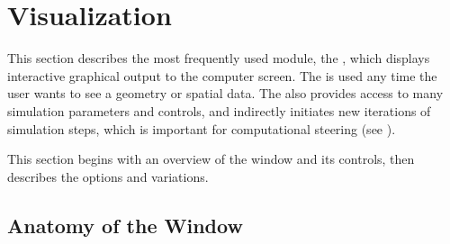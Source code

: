  \newcommand{\boxwidget}%
  {\centerline{\epsfig{file=Figures/widget-box.eps.gz,height=2in,
  bbllx=0, bblly=0, bburx=458, bbury=342}}}
\begin{htmlonly}
  \newcommand{\boxwidget}{%
  \htmladdimg[align=top,width=459,alt="boxwidget"]
  {../Figures/widget-box.gif}}
\end{htmlonly}

  \newcommand{\ringwidget}%
  {\centerline{\epsfig{file=Figures/widget-ring.eps.gz,height=2in,
  bbllx=0, bblly=0, bburx=507, bbury=467}}}
\begin{htmlonly}
  \newcommand{\ringwidget}{%
  \htmladdimg[align=top,width=508,alt="ringwidget"]
  {../Figures/widget-ring.gif}}
\end{htmlonly}

  \newcommand{\recordmoviewin}%
  {\centerline{\epsfig{file=Figures/record_movie_win.eps.gz,
  bbllx=0, bblly=0, bburx=257, bbury=175}}}
\begin{htmlonly}
  \newcommand{\recordmoviewin}{%
  \htmladdimg[align=top,alt="Movie Recording Dialog"]
  {../Figures/record_movie_win.gif}}
\end{htmlonly}

\newcommand{\graphics}{\emph{Graphics}}

\chapter{Visualization}
\label{ch:viewer}

This section describes the most frequently used \sr{} module,
the \viewer{}, which displays interactive graphical
output to the computer screen.  The \viewer{} is used any time the user
wants to see a geometry or spatial data. The \viewer{} also provides access to
many simulation parameters and controls, and indirectly initiates new
iterations of  simulation steps, which is important for computational steering (see ).

This section begins with an overview of the \viewer{} window and its
controls, then describes the options and variations.

\section{Anatomy of the \viewer{} Window}
\label{sec:viewer-anatomy} 

